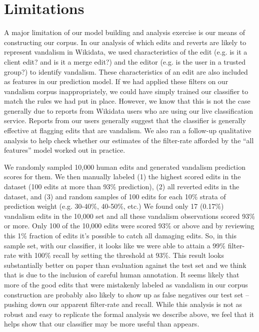 \documentclass{sig-alternate}
\begin{document}
\section{Limitations}

A major limitation of our model building and analysis exercise is our means of constructing our corpus. In our analysis of which edits and reverts are likely to represent vandalism in Wikidata, we used characteristics of the edit (e.g. is it a client edit? and is it a merge edit?) and the editor (e.g. is the user in a trusted group?) to identify vandalism. These characteristics of an edit are also included as features in our prediction model. If we had applied these filters on our vandalism corpus inappropriately, we could have simply trained our classifier to match the rules we had put in place. However, we know that this is not the case generally due to reports from Wikidata users who are using our live classification service. Reports from our users generally suggest that the classifier is generally effective at flagging edits that are vandalism. We also ran a follow-up qualitative analysis to help check whether our estimates of the filter-rate afforded by the ``all features'' model worked out in practice.

We randomly sampled 10,000 human edits and generated vandalism prediction scores for them.  We then manually labeled (1) the highest scored edits in the dataset (100 edits at more than 93\% prediction), (2) all reverted edits in the dataset, and (3) and random samples of 100 edits for each 10\% strata of prediction weight (e.g. 30-40\%, 40-50\%, etc.)  We found only 17 (0.17\%) vandalism edits in the 10,000 set and all these vandalism observations scored 93\% or more. Only 100 of the 10,000 edits were scored 93\% or above and by reviewing this 1\% fraction of edits it's possible to catch all damaging edits. So, in this sample set, with our classifier, it looks like we were able to attain a 99\% filter-rate with 100\% recall by setting the threshold at 93\%.  This result looks substantially better on paper than evaluation against the test set and we think that is due to the inclusion of careful human annotation. It seems likely that more of the good edits that were mistakenly labeled as vandalism in our corpus construction are probably also likely to show up as false negatives our test set -- pushing down our apparent filter-rate and recall. While this analysis is not as robust and easy to replicate the formal analysis we describe above, we feel that it helps show that our classifier may be more useful than appears.
\end{document}
